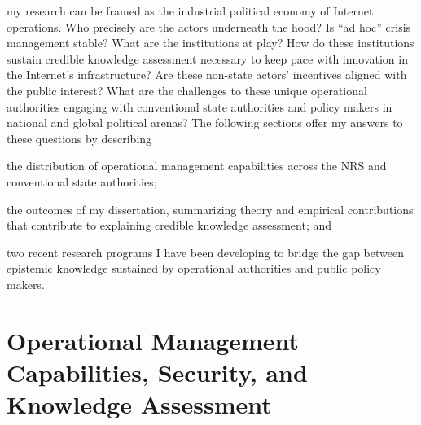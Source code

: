 \documentclass[12pt,journal,compsoc,letterpaper,onecolumn,twoside]{IEEEtran}
\begin{document}

 my research can be framed as the industrial political economy of
Internet operations.
%
Who precisely are the actors underneath the hood?
%
Is ``ad hoc'' crisis management stable?
%
What are the institutions at play?
%
How do these institutions sustain credible knowledge assessment
necessary to keep 
pace with innovation in the Internet's infrastructure?
%
Are these non-state actors' incentives aligned with the public interest?
%
What are the challenges to these unique operational authorities engaging
with conventional state authorities and policy makers in national and
global political arenas?
%
The following sections offer my answers to these questions by describing   
%
\begin{inparaenum}[\itshape 1\upshape)]
  \item the distribution of operational management capabilities across
    the NRS and conventional state authorities; 
  \item the outcomes of my dissertation, summarizing theory and
    empirical contributions that contribute to explaining credible knowledge
    assessment; and  
  \item two recent research programs I have been developing to bridge
    the gap between epistemic knowledge sustained by operational
    authorities and public policy 
    makers. 
\end{inparaenum}

\section{Operational Management Capabilities, Security, and
  Knowledge Assessment} \label{sec:capabilities}
\end{document}
